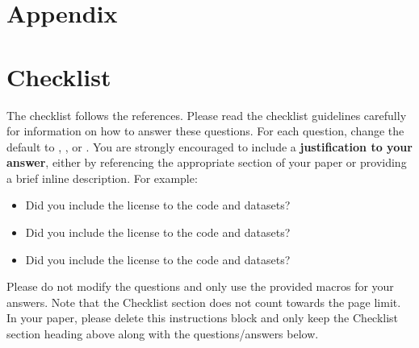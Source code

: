 \documentclass{article}
\begin{document}




\newpage
\appendix
\section*{Appendix}


\section*{Checklist}

The checklist follows the references.  Please
read the checklist guidelines carefully for information on how to answer these
questions.  For each question, change the default \answerTODO{} to \answerYes{},
\answerNo{}, or \answerNA{}.  You are strongly encouraged to include a {\bf
justification to your answer}, either by referencing the appropriate section of
your paper or providing a brief inline description.  For example:
\begin{itemize}
  \item Did you include the license to the code and datasets? \answerYes{}
  \item Did you include the license to the code and datasets? 
  \item Did you include the license to the code and datasets? \answerNA{}
\end{itemize}
Please do not modify the questions and only use the provided macros for your
answers.  Note that the Checklist section does not count towards the page
limit.  In your paper, please delete this instructions block and only keep the
Checklist section heading above along with the questions/answers below.
\end{document}
